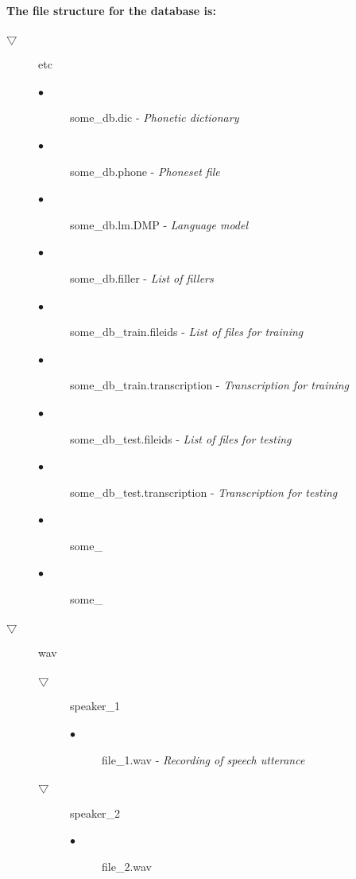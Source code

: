 \documentclass[12pt,a4paper,oneside]{memoir}
\begin{document}
\textbf{The file structure for the database is:} 

\begin{description}
 \item[$\bigtriangledown$] etc
	\begin{description}
		\item[$\bullet$] some\_db.dic - \textit{Phonetic dictionary}
		\item[$\bullet$] some\_db.phone - \textit{Phoneset file}
		\item[$\bullet$] some\_db.lm.DMP - \textit{Language model}
		\item[$\bullet$] some\_db.filler - \textit{List of fillers}
		\item[$\bullet$] some\_db\_train.fileids - \textit{List of files for training}
		\item[$\bullet$] some\_db\_train.transcription - \textit{Transcription for training}
		\item[$\bullet$] some\_db\_test.fileids - \textit{List of files for testing}
		\item[$\bullet$] some\_db\_test.transcription - \textit{Transcription for testing}
		\item[$\bullet$] some\_
		\item[$\bullet$] some\_
	\end{description}
 \item[$\bigtriangledown$] wav
	\begin{description}
		\item[$\bigtriangledown$] speaker\_1
			\begin{description}
				\item[$\bullet$] file\_1.wav - \textit{Recording of speech utterance}
			\end{description}
		\item[$\bigtriangledown$] speaker\_2
			\begin{description}
				\item[$\bullet$]file\_2.wav
			\end{description}
	\end{description}	
\end{description}
\end{document}
